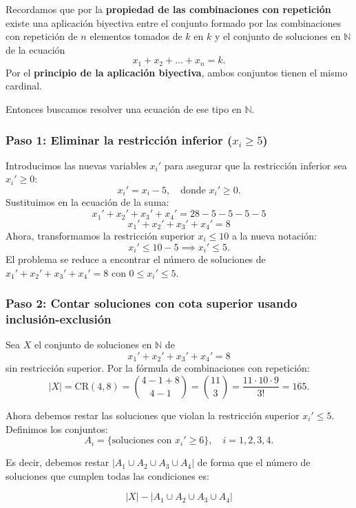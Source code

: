 \documentclass[a4paper,12pt]{article}
\begin{document}
\begin{ejercicio}[title=Ejercicio 36]

Recordamos que por la \textbf{propiedad de las combinaciones con repetición} existe una aplicación biyectiva entre el conjunto formado por las combinaciones con repetición de $n$ elementos tomados de $k$ en $k$ y el conjunto de soluciones en $\mathbb{N}$ de la ecuación
\[
x_1+x_2+\dots+x_n = k.
\]
Por el \textbf{principio de la aplicación biyectiva}, ambos conjuntos tienen el mismo cardinal.

Entonces buscamos resolver una ecuación de ese tipo en $\mathbb{N}$.

\subsubsection*{Paso 1: Eliminar la restricción inferior ($x_i \ge 5$)}

Introducimos las nuevas variables $x_i'$ para asegurar que la restricción inferior sea $x_i' \ge 0$:
\[
x_i' = x_i - 5, \quad \text{donde } x_i' \ge 0.
\]
Sustituimos en la ecuación de la suma:
\[
x_1' + x_2' + x_3' + x_4' = 28 -5-5-5-5
\]
\[
x_1' + x_2' + x_3' + x_4' = 8
\]
Ahora, transformamos la restricción superior $x_i \le 10$ a la nueva notación:
\[
x_i' \le 10 - 5 \implies x_i' \le 5.
\]
El problema se reduce a encontrar el número de soluciones de $x_1' + x_2' + x_3' + x_4' = 8$ con $0 \le x_i' \le 5$.

\subsubsection*{Paso 2: Contar soluciones con cota superior usando inclusión-exclusión}

Sea \(X\) el conjunto de soluciones en \(\mathbb{N}\) de
\[
x_1'+x_2'+x_3'+x_4'=8
\]
sin restricción superior. Por la fórmula de combinaciones con repetición:
\[
|X| = \mathrm{CR}(4,8) = \binom{4-1+8}{4-1} = \binom{11}{3} = \frac{11\cdot 10 \cdot 9}{3!} = 165.
\]

Ahora debemos restar las soluciones que violan la restricción superior \(x_i' \le 5\).  
Definimos los conjuntos:
\[
A_i = \{ \text{soluciones con } x_i' \ge 6 \}, \quad i=1,2,3,4.
\]

Es decir, debemos restar $|A_1 \cup A_2 \cup A_3 \cup A_4|$ de forma que el número de soluciones que cumplen todas las condiciones es:

\[
|X| - |A_1 \cup A_2 \cup A_3 \cup A_4|
\]

\end{ejercicio}
\end{document}
